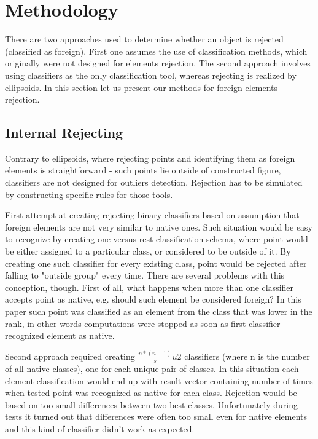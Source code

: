 \documentclass{llncs}
\begin{document}
\section{Methodology}
  \label{sec:Methodology}
  
There are two approaches used to determine whether an object is rejected (classified as foreign). First one assumes the use of classification methods, which originally were not designed for elements rejection. The second approach involves using classifiers as the only classification tool, whereas rejecting is realized by ellipsoids. In this section let us present our methods for foreign elements rejection.

\subsection{Internal Rejecting}
  \label{subsec:InternalRejecting}

Contrary to ellipsoids, where rejecting points and identifying them as foreign elements is straightforward - such points lie outside of constructed figure, classifiers are not designed for outliers detection. Rejection has to be simulated by constructing specific rules for those tools.

First attempt at creating rejecting binary classifiers based on assumption that foreign elements are not very similar to native ones. Such situation would be easy to recognize by creating one-versus-rest classification schema, where point would be either assigned to a particular class, or considered to be outside of it. By creating one such classifier for every existing class, point would be rejected after falling to "outside group" every time. There are several problems with this conception, though. First of all, what happens when more than one classifier accepts point as native, e.g. should such element be considered foreign? In this paper such point was classified as an element from the class that was lower in the rank, in other words computations were stopped as soon as first classifier recognized element as native.

Second approach required creating $\frac{n * (n-1)}su{2}$ classifiers (where n is the number of all native classes), one for each unique pair of classes. In this situation each element classification would end up with result vector containing number of times when tested point was recognized as native for each class. Rejection would be based on too small differences between two best classes. Unfortunately during tests it turned out that differences were often too small even for native elements and this kind of classifier didn't work as expected.
\end{document}
